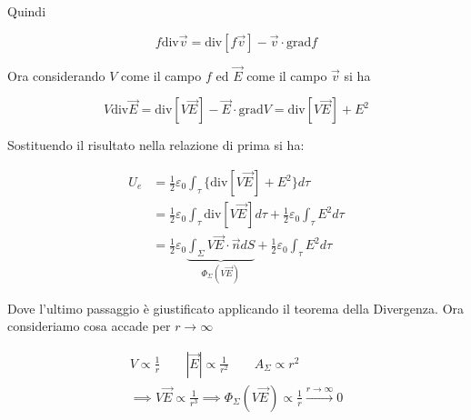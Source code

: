Quindi

\[
	f\text{div}\vec{v} = \text{div}[f\vec{v}] - \vec{v} \cdot \text{grad}f
\]

Ora considerando $V$ come il campo $ f $ ed $ \vec{E}  $ come il campo $ \vec{v}  $ si ha

\[
	 V\text{div}\vec{E} = \text{div}[V\vec{E}] - \vec{E} \cdot \text{grad}V = \text{div}[V\vec{E}] + E^2
\]

Sostituendo il risultato nella relazione di prima si ha:

\begin{align*}
	U_e &= \frac{1}{2} \varepsilon_0\int_{\tau}  \{\text{div}[V\vec{E}] + E^2 \}  d\tau \\
	&=  \frac{1}{2} \varepsilon_0\int_{\tau}  \text{div}[V\vec{E}] d\tau + \frac{1}{2} \varepsilon_0\int_{\tau} E^2  d\tau \\
	&= \frac{1}{2} \varepsilon_0 \underbrace{\int_{\Sigma}  V\vec{E}\cdot \vec{n} dS}_{\Phi_{\Sigma}(V\vec{E})} + \frac{1}{2} \varepsilon_0\int_{\tau} E^2  d\tau
\end{align*}

Dove l'ultimo passaggio è giustificato applicando il teorema della Divergenza. Ora consideriamo cosa accade per $ r \to \infty  $

\begin{gather*}
	V \propto  \frac{1}{r} \qquad
	|\vec{E} | \propto \frac{1}{r^2} \qquad
	A_{\Sigma} \propto r^2  \\
	\implies  V\vec{E} \propto \frac{1}{r^3} \implies \Phi_{\Sigma}(V\vec{E}) \propto \frac{1}{r} \xrightarrow{r\rightarrow \infty} 0
\end{gather*}

